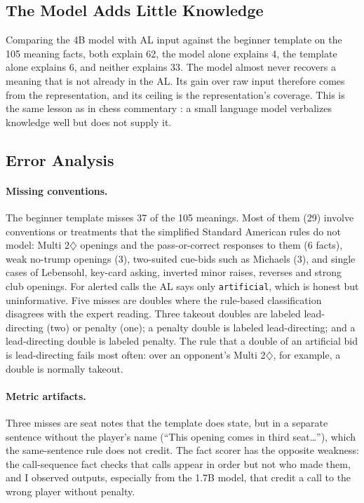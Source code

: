 \documentclass[11pt]{article}
\newcommand{\suitD}{$\diamondsuit$}
\begin{document}
\subsection{The Model Adds Little Knowledge}

Comparing the 4B model with AL input against the beginner template on the 105 meaning facts, both explain 62, the model alone explains 4, the template alone explains 6, and neither explains 33. The model almost never recovers a meaning that is not already in the AL. Its gain over raw input therefore comes from the representation, and its ceiling is the representation's coverage. This is the same lesson as in chess commentary \citep{zang2019chess}: a small language model verbalizes knowledge well but does not supply it.

\subsection{Error Analysis}

\paragraph{Missing conventions.} The beginner template misses 37 of the 105 meanings. Most of them (29) involve conventions or treatments that the simplified Standard American rules do not model: Multi 2\suitD{} openings and the pass-or-correct responses to them (6 facts), weak no-trump openings (3), two-suited cue-bids such as Michaels (3), and single cases of Lebensohl, key-card asking, inverted minor raises, reverses and strong club openings. For alerted calls the AL says only \texttt{artificial}, which is honest but uninformative. Five misses are doubles where the rule-based classification disagrees with the expert reading. Three takeout doubles are labeled lead-directing (two) or penalty (one); a penalty double is labeled lead-directing; and a lead-directing double is labeled penalty. The rule that a double of an artificial bid is lead-directing fails most often: over an opponent's Multi 2\suitD{}, for example, a double is normally takeout.

\paragraph{Metric artifacts.} Three misses are seat notes that the template does state, but in a separate sentence without the player's name (``This opening comes in third seat\ldots''), which the same-sentence rule does not credit. The fact scorer has the opposite weakness: the call-sequence fact checks that calls appear in order but not who made them, and I observed outputs, especially from the 1.7B model, that credit a call to the wrong player without penalty.
\end{document}
